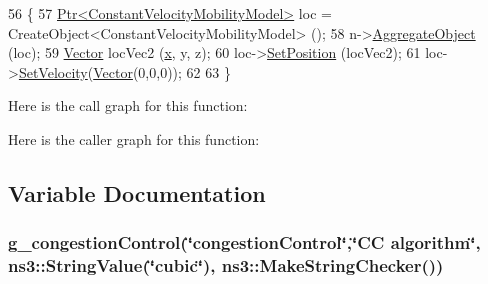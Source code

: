 \begin{DoxyCode}
56 \{
57   \hyperlink{classns3_1_1Ptr}{Ptr<ConstantVelocityMobilityModel>} loc = 
      CreateObject<ConstantVelocityMobilityModel> ();
58   n->\hyperlink{classns3_1_1Object_a79dd435d300f3deca814553f561a2922}{AggregateObject} (loc);
59   \hyperlink{classns3_1_1Vector3D_a7e59b47bc94c9cb1dadff68c1d0112d8}{Vector} locVec2 (\hyperlink{lte__link__budget__x2__handover__measures_8m_a9336ebf25087d91c818ee6e9ec29f8c1}{x}, y, z);
60   loc->\hyperlink{classns3_1_1MobilityModel_ac584b3d5a309709d2f13ed6ada1e7640}{SetPosition} (locVec2);  
61   loc->\hyperlink{classns3_1_1ConstantVelocityMobilityModel_a8754fbb7b1722d0454f28cd1a30afc27}{SetVelocity}(\hyperlink{classns3_1_1Vector3D_a7e59b47bc94c9cb1dadff68c1d0112d8}{Vector}(0,0,0));
62 
63 \}
\end{DoxyCode}


Here is the call graph for this function\+:




Here is the caller graph for this function\+:




\subsection{Variable Documentation}
\subsubsection[{\texorpdfstring{g\+\_\+congestion\+Control}{g_congestionControl}}]{ g\+\_\+congestion\+Control(\char`\"{}congestion\+Control\char`\"{},\char`\"{}CC algorithm\char`\"{}, ns3\+::\+String\+Value(\char`\"{}cubic\char`\"{}), ns3\+::\+Make\+String\+Checker())\hspace{0.3cm}{\ttfamily [static]}}\hypertarget{dce-example-mptcp-mmwave_8cc_ad03068a716d0c10c0eb468ff51a24e60}{}\label{dce-example-mptcp-mmwave_8cc_ad03068a716d0c10c0eb468ff51a24e60}
